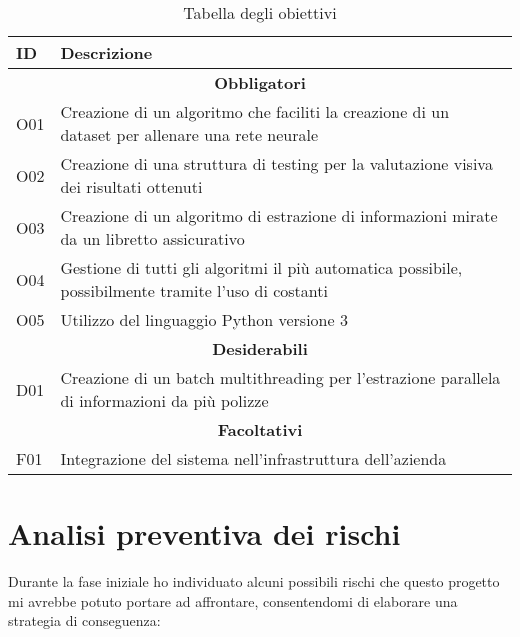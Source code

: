 {
    \def\arraystretch{2}\tabcolsep=10pt
\begin{table}[H]
    \small
    \begin{tabular}{ |p{2cm} |p{11cm}|}
        \hline
        \textbf{ID} & \textbf{Descrizione} \\ \hline
        
        \multicolumn{2}{|c|}{\textbf{Obbligatori}} \\ \hline
        
        O01 & Creazione di un algoritmo che faciliti la creazione di un dataset per allenare una rete neurale \\ \hline
        O02 & Creazione di una struttura di testing per la valutazione visiva dei risultati ottenuti \\ \hline
        O03 & Creazione di un algoritmo di estrazione di informazioni mirate da un libretto assicurativo \\ \hline
        O04 & Gestione di tutti gli algoritmi il più automatica possibile, possibilmente tramite l'uso di costanti \\ \hline
        O05 & Utilizzo del linguaggio Python versione 3 \\ \hline
        
        \multicolumn{2}{|c|}{\textbf{Desiderabili}} \\ \hline
        
        D01 & Creazione di un batch multithreading per l'estrazione parallela di informazioni da più polizze \\ \hline
        
        \multicolumn{2}{|c|}{\textbf{Facoltativi}} \\ \hline
        
        F01 & Integrazione del sistema nell'infrastruttura dell'azienda \\ \hline
        
    \end{tabular}
    \caption{Tabella degli obiettivi}
\end{table}
}
    
   
\section{Analisi preventiva dei rischi}
Durante la fase iniziale ho individuato alcuni possibili rischi che questo progetto mi avrebbe potuto portare ad affrontare, consentendomi di elaborare una strategia di conseguenza:

